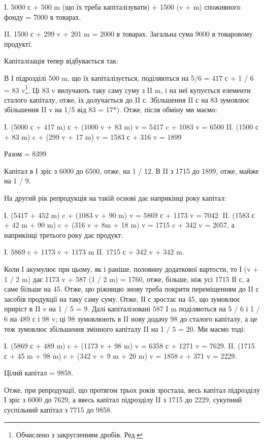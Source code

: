 I.  5000 с + 500 m (що їх треба капіталізувати) + 1500 (v + m) споживного
фонду = 7000 в товарах.

II.    1500 с + 299 v + 201 m = 2000 в товарах. Загальна сума 9000 в
товаровому продукті.

Капіталізація тепер відбувається так:

В І підрозділі 500 m, що їх капіталізується, поділяються на 5/6 =
417 с + 1 / 6 = 83 v\footnote*{
Обчислено з закругленням дробів. Ред.
}. Ці 83 v вилучають таку саму суму з II m, і на
неї купується елементи сталого капіталу, отже, їх долучається до II с.
Збільшення II с на 83 зумовлює збільшення II v на 1/5 від 83 = 17*).
Отже, після обміну ми маємо:

I. (5000 с + 417 m) с + (1000 v + 83 m) v = 5417 c + 1083 v = 6500
II. (1500 с + 83 m) c + (299 v + 17 m) v = 1583 с + 316 v = 1899

Разом = 8399

Капітал в І зріс з 6000 до 6500, отже, на 1 / 12. В II з 1715 до 1899,
отже, майже на 1 / 9.

На другий рік репродукція на такій основі дає наприкінці року
капітал:

І. (5417 + 452 m) c + (1083 v + 90 m) v = 5869 с + 1173 v = 7042.
II. (1583 с + 42 m + 90 m) c + (316 v + 8m + 18 m) v = 1715 c + 342 v =
2057,
а наприкінці третього року дає продукт:

I. 5869 c + 1173 v + 1173 m
II. 1715 с + 342 v + 342 m.

Коли І акумулює при цьому, як і раніше, половину додаткової вартости,
то І (v + 1 / 2 m) дає 1173 v + 587 (1 / 2 m) = 1760, отже, більше,
ніж усі 1715 ІІ с, а саме більше на 45. Отже, цю ріжницю знову треба
покрити переміщенням до II с засобів продукції на таку саму суму. Отже,
ІІ с зростає на 45, що зумовлює приріст в II v на 1 / 5 = 9. Далі капіталізовані
587 I m поділяються на 5 / 6 і 1 / 6 на 489 с і 98 v; ці 98 зумовлюють
в II нову додачу 98 до сталого капіталу, а це теж зумовлює
збільшення змінного капіталу II на 1 / 5 = 20. Ми маємо тоді:

І. (5869 с + 489 m) c + (1173 v + 98 m) v = 6358 с + 1271 v = 7629.
II. (1715 с + 45 m + 98 m) c + (342 v + 9 m + 20 m) v = 1858 c + 371 v = 2229.

Цілий капітал = 9858.

Отже, при репродукції, що протягом трьох років зростала,
весь капітал підрозділу І зріс з 6000 до 7629, а ввесь капітал підрозділу
II з 1715 до 2229, сукупний суспільний капітал з 7715 до 9858.
